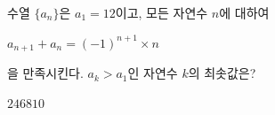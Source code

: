 수열 $\{a_n\}$은 $a_1=12$이고, 모든 자연수 $n$에 대하여 \par\smallskip\noindent\hspace*{1.5em}$a_{n+1}+a_n=(-1)^{n+1}\times n$\par\smallskip\noindent 을 만족시킨다. $a_k>a_1$인 자연수 $k$의 최솟값은?
\begin{choices32}{$2$}{$4$}{$6$}{$8$}{$10$}\end{choices32}
